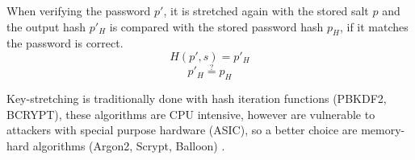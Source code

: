 When verifying the password $p'$, it is stretched again with the stored salt $p$ and the output hash $p{'}_H$ is compared with the stored password hash $p_H$, if it matches the password is correct.
$$H(p', s) = p{'}_H$$
$$p{'}_H \stackrel{?}{=} p_H$$

Key-stretching \cite{blocki2018economics} is traditionally done with hash iteration functions (PBKDF2, BCRYPT), these algorithms are CPU intensive, however are vulnerable to attackers with special purpose hardware (ASIC), so a better choice are memory-hard algorithms (Argon2, Scrypt, Balloon) \cite{biryukov2016argon2, percival2016scrypt, boneh2016balloon}.\\
%
%

